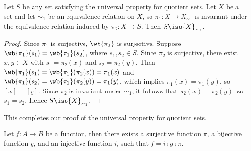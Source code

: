 \documentclass[10pt]{article}
\begin{document}
\begin{proposition}
    Let $S$ be any set satisfying the universal property for quotient sets. Let $X$ be a set and let ${\sim}_{1}$ be an equivalence relation on $X$, so ${\pi}_{1}:X\to{X}_{{\sim}_{1}}$ is invariant under the equivalence relation induced by ${\pi}_{2}:X\to S$. Then $S\iso{X}_{{\sim}_{1}}$.
\end{proposition}
\begin{center}
\end{center}
\begin{proof}
    Since ${\pi}_{1}$ is surjective, $\wb{{\pi}_{1}}$ is surjective. Suppose $\wb{{\pi}_{1}}({s}_{1})=\wb{{\pi}_{1}}({s}_{2})$, where ${s}_{1}, {s}_{2}\in S$. Since $\pi_2$ is surjective, there exist $x,y\in X$ with ${s}_{1}={\pi}_{2}(x)$ and ${s}_{2}={\pi}_{2}(y)$. Then $\wb{{\pi}_{1}}({s}_{1})=\wb{{\pi}_{1}}({\pi}_{2}(x))={\pi}_{1}(x)$ and $\wb{{\pi}_{1}}({s}_{2})=\wb{{\pi}_{1}}({\pi}_{2}(y))={\pi}_{1}(y)$, which implies ${\pi}_{1}(x)={\pi}_{1}(y)$, so $[x]=[y]$. Since ${\pi}_{2}$ is invariant under ${\sim}_{1}$, it follows that ${\pi}_{2}(x)={\pi}_{2}(y)$, so ${s}_{1}={s}_{2}$. Hence $S\iso{X}_{{\sim}_{1}}$.        
\end{proof}
\par
This completes our proof of the universal property for quotient sets.
\begin{theorem}
    Let $f:A\to B$ be a function, then there exists a surjective function $\pi$, a bijective function $g$, and an injective function $i$, such that $f=i\comp g\comp\pi$.
\end{theorem}
\begin{center}
\end{center}
\end{document}
